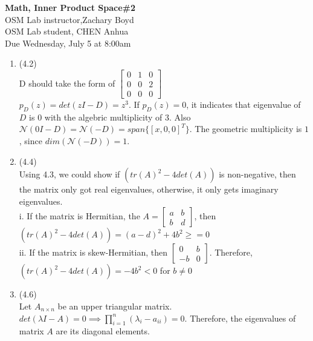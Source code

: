 \documentclass[letterpaper,12pt]{article}
\theoremstyle{definition}
\begin{document}
\begin{flushleft}
   \textbf{\large{Math, Inner Product Space\#2}} \\[5pt]
   OSM Lab instructor,Zachary Boyd \\[5pt]
   OSM Lab student, CHEN Anhua\\[5pt]
   Due Wednesday, July 5 at 8:00am
\end{flushleft}

\vspace{5mm}


\begin{enumerate}
	\item (4.2)\\
	D should take the form of 
	$\begin{bmatrix}
	   0 & 1 & 0\\
	   0 & 0 & 2\\
	   0 & 0 & 0
	\end{bmatrix} $\\
	$p_{D}(z) = det(zI - D) = z^{3}$. If $p_{D}(z) = 0$, it indicates that eigenvalue of $D$ is $0$ with the algebric multiplicity of 3. Also $\mathcal{N}(0I - D) = \mathcal{N}(-D) = span\{[x, 0, 0]^{T}\}$. The geometric multiplicity is $1$, since $dim(\mathcal{N}(-D)) = 1$.\\
	
	\item(4.4)\\
	Using 4.3, we could show if $(tr(A)^{2} - 4det(A))$ is non-negative, then the matrix only got real eigenvalues, otherwise, it only gets imaginary eigenvalues.\\
	i. If the matrix is Hermitian, the $A =\begin{bmatrix}
	   a & b \\
	   b & d 
	\end{bmatrix}  $, then $(tr(A)^{2} - 4det(A)) = (a - d)^{2} + 4b^{2} \geq = 0$\\
	ii. If the matrix is skew-Hermitian, then $\begin{bmatrix}
	   0 & b \\
	   -b & 0 
	\end{bmatrix} $. Therefore, $(tr(A)^{2} - 4det(A)) = -4b^{2} < 0$ for $b \neq 0$\\
	
	
	\item(4.6)\\
	Let $A_{n \times n}$ be an upper triangular matrix. $det(\lambda I - A) = 0 \implies \prod_{i = 1}^{n}(\lambda_{i} - a_{ii}) = 0$. Therefore, the eigenvalues of matrix $A$ are its diagonal elements.\\
	

\end{enumerate}
\end{document}
